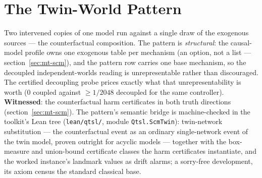 

\section{The Twin-World Pattern}
\label{sec:cp-twin}

Two intervened copies of one model run against a single draw of the
exogenous sources --- the counterfactual composition. The pattern is
\emph{structural}: the causal-model profile owns one exogenous table
per mechanism (an option, not a list ---
section~\ref{sec:mt-scm}), and the pattern row carries one base
mechanism, so the decoupled independent-worlds reading is
unrepresentable rather than discouraged. The certified decoupling
probe prices exactly what that unrepresentability is worth ($0$
coupled against $\ge 1/2048$ decoupled for the same controller).
\textbf{Witnessed}: the counterfactual harm certificates in both
truth directions (section~\ref{sec:mt-scm}). The pattern's semantic
bridge is machine-checked in the toolkit's Lean tree
(\texttt{lean/qtsl/}, module \texttt{Qtsl.ScmTwin}): twin-network
substitution --- the counterfactual event as an ordinary
single-network event of the twin model, proven outright for acyclic
models --- together with the box-measure and union-bound certificate
classes the harm certificates instantiate, and the worked instance's
landmark values as drift alarms; a sorry-free development, its axiom
census the standard classical base.

